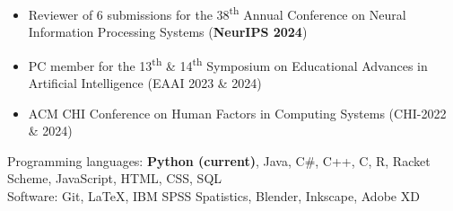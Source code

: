 \vspace{-10pt}
\begin{small} \color{black}
\begin{itemize}
    \setlength\itemsep{-0.25em}
    \item Reviewer of 6 submissions for the 38\textsuperscript{th} Annual Conference on Neural Information Processing Systems (\textbf{NeurIPS 2024})
    \item PC member for the 13\textsuperscript{th} \& 14\textsuperscript{th} Symposium on Educational Advances in Artificial Intelligence (EAAI 2023 \& 2024)
    \item ACM CHI Conference on Human Factors in Computing Systems (CHI-2022 \& 2024)
\end{itemize}
\end{small}



\vspace{-8pt}

\begin{small} \color{black}
\vspace{-6pt}
Programming languages: \textbf{Python (current)}, Java, C\#, C++, C, R, Racket Scheme, JavaScript, HTML, CSS, SQL \\
Software: Git, \LaTeX, IBM SPSS Spatistics, Blender, Inkscape, Adobe XD \\
\end{small}



